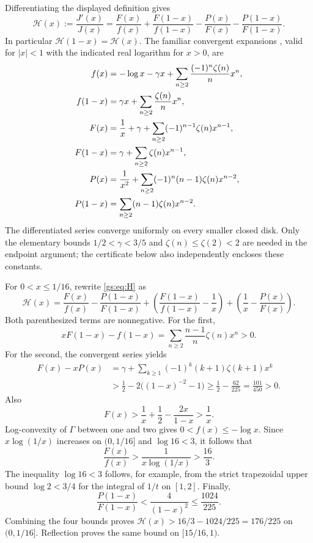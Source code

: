 Differentiating the displayed definition gives
\begin{equation}\label{gs:eq:H}
 \mathcal H(x):=\frac{J'(x)}{J(x)}
 =\frac{F(x)}{f(x)}+\frac{F(1-x)}{f(1-x)}
  -\frac{P(x)}{F(x)}-\frac{P(1-x)}{F(1-x)}.
\end{equation}
In particular $\mathcal H(1-x)=\mathcal H(x)$.
The familiar convergent expansions \cite[\S5.7]{joint:DLMF}, valid
for $|x|<1$ with the indicated real logarithm for $x>0$, are
\begin{align}
 f(x)&=-\log x-\gamma x+
               \sum_{n\ge2}\frac{(-1)^n\zeta(n)}n x^n,\notag\\
 f(1-x)&=\gamma x+\sum_{n\ge2}\frac{\zeta(n)}n x^n,\notag\\
 F(x)&=\frac1x+\gamma+
               \sum_{n\ge2}(-1)^{n-1}\zeta(n)x^{n-1},\notag\\
 F(1-x)&=\gamma+\sum_{n\ge2}\zeta(n)x^{n-1},\notag\\
 P(x)&=\frac1{x^2}+\sum_{n\ge2}(-1)^n(n-1)\zeta(n)x^{n-2},\notag\\
 P(1-x)&=\sum_{n\ge2}(n-1)\zeta(n)x^{n-2}.
 \label{gs:eq:series}
\end{align}
The differentiated series converge uniformly on every smaller closed
disk. Only the elementary bounds $1/2<\gamma<3/5$ and
$\zeta(n)\le\zeta(2)<2$ are needed in the endpoint argument; the
certificate below also independently encloses these constants.

For $0<x\le1/16$, rewrite \eqref{gs:eq:H} as
\[
 \mathcal H(x)=\frac{F(x)}{f(x)}-\frac{P(1-x)}{F(1-x)}
 +\left(\frac{F(1-x)}{f(1-x)}-\frac1x\right)
 +\left(\frac1x-\frac{P(x)}{F(x)}\right).
\]
Both parenthesized terms are nonnegative. For the first,
\[
 xF(1-x)-f(1-x)
 =\sum_{n\ge2}\frac{n-1}{n}\zeta(n)x^n>0.
\]
For the second, the convergent series yields
\begin{align*}
 F(x)-xP(x)
 &=\gamma+\sum_{k\ge1}(-1)^k(k+1)\zeta(k+1)x^k\\
 &>\frac12-2\bigl((1-x)^{-2}-1\bigr)
 \ge\frac12-\frac{62}{225}=\frac{101}{450}>0.
\end{align*}
Also
\[
 F(x)>\frac1x+\frac12-\frac{2x}{1-x}>\frac1x.
\]
Log-convexity of $\Gamma$ between one and two gives
$0<f(x)\le-\log x$. Since $x\log(1/x)$ increases on $(0,1/16]$
and $\log16<3$, it follows that
\[
 \frac{F(x)}{f(x)}>\frac1{x\log(1/x)}>\frac{16}{3}.
\]
The inequality $\log16<3$ follows, for example, from the strict
trapezoidal upper bound $\log2<3/4$ for the integral of $1/t$ on
$[1,2]$. Finally,
\[
 \frac{P(1-x)}{F(1-x)}
 <\frac{4}{(1-x)^2}\le\frac{1024}{225}.
\]
Combining the four bounds proves
$\mathcal H(x)>16/3-1024/225=176/225$ on $(0,1/16]$.
Reflection proves the same bound on $[15/16,1)$.

